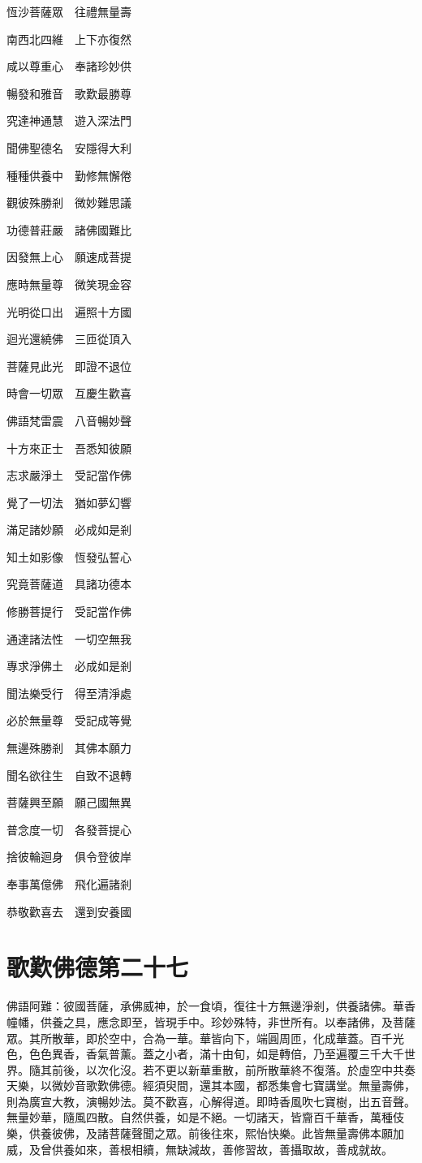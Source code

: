 \documentclass{zhvt-classic}
\begin{document}
恆沙菩薩眾　往禮無量壽

南西北四維　上下亦復然

咸以尊重心　奉諸珍妙供

暢發和雅音　歌歎最勝尊

究達神通慧　遊入深法門

聞佛聖德名　安隱得大利

種種供養中　勤修無懈倦

觀彼殊勝剎　微妙難思議

功德普莊嚴　諸佛國難比

因發無上心　願速成菩提

應時無量尊　微笑現金容

光明從口出　遍照十方國

迴光還繞佛　三匝從頂入

菩薩見此光　即證不退位

時會一切眾　互慶生歡喜

佛語梵雷震　八音暢妙聲

十方來正士　吾悉知彼願

志求嚴淨土　受記當作佛

覺了一切法　猶如夢幻響

滿足諸妙願　必成如是剎

知土如影像　恆發弘誓心

究竟菩薩道　具諸功德本

修勝菩提行　受記當作佛

通達諸法性　一切空無我

專求淨佛土　必成如是剎

聞法樂受行　得至清淨處

必於無量尊　受記成等覺

無邊殊勝剎　其佛本願力

聞名欲往生　自致不退轉

菩薩興至願　願己國無異

普念度一切　各發菩提心

捨彼輪迴身　俱令登彼岸

奉事萬億佛　飛化遍諸剎

恭敬歡喜去　還到安養國

\chapter*{歌歎佛德第二十七}

佛語阿難：彼國菩薩，承佛威神，於一食頃，復往十方無邊淨剎，供養諸佛。華香幢幡，供養之具，應念即至，皆現手中。珍妙殊特，非世所有。以奉諸佛，及菩薩眾。其所散華，即於空中，合為一華。華皆向下，端圓周匝，化成華蓋。百千光色，色色異香，香氣普薰。蓋之小者，滿十由旬，如是轉倍，乃至遍覆三千大千世界。隨其前後，以次化沒。若不更以新華重散，前所散華終不復落。於虛空中共奏天樂，以微妙音歌歎佛德。經須臾間，還其本國，都悉集會七寶講堂。無量壽佛，則為廣宣大教，演暢妙法。莫不歡喜，心解得道。即時香風吹七寶樹，出五音聲。無量妙華，隨風四散。自然供養，如是不絕。一切諸天，皆齎百千華香，萬種伎樂，供養彼佛，及諸菩薩聲聞之眾。前後往來，熙怡快樂。此皆無量壽佛本願加威，及曾供養如來，善根相續，無缺減故，善修習故，善攝取故，善成就故。
\end{document}
